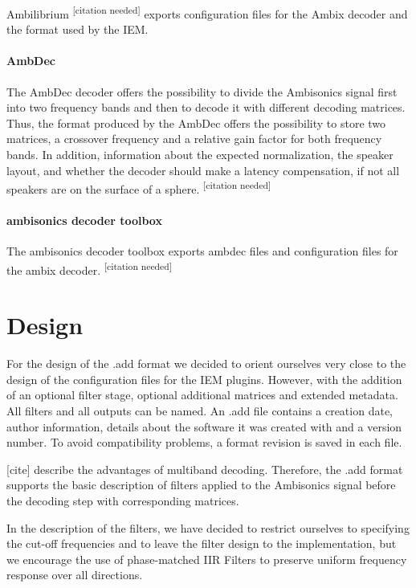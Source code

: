 \documentclass[a4paper, 10pt, twocolumn]{article}
\newcommand{\citationneeded}[1][]{\textsuperscript{\color{black} [citation needed]}}
\begin{document}
Ambilibrium \citationneeded{} exports configuration files for the Ambix decoder and the format used by the IEM.

\paragraph{AmbDec}

The AmbDec decoder offers the possibility to divide the Ambisonics signal first into two frequency bands and then to decode it with different decoding matrices. Thus, the format produced by the AmbDec offers the possibility to store two matrices, a crossover frequency and a relative gain factor for both frequency bands. In addition, information about the expected normalization, the speaker layout, and whether the decoder should make a latency compensation, if not all speakers are on the surface of a sphere.\citationneeded{}

\paragraph{ambisonics decoder toolbox}

The ambisonics decoder toolbox exports ambdec files and configuration files for the ambix decoder.\citationneeded{}


\section{Design} \label{sec:Design}

For the design of the .add format we decided to orient ourselves very close to the design of the configuration files for the IEM plugins. However, with the addition of an optional filter stage, optional additional matrices and extended metadata. All filters and all outputs can be named. An .add file contains a creation date, author information, details about the software it was created with and a version number. To avoid compatibility problems, a format revision is saved in each file. 

[cite] describe the advantages of multiband decoding. Therefore, the .add format supports the basic description of filters applied to the Ambisonics signal before the decoding step with corresponding matrices.

In the description of the filters, we have decided to restrict ourselves to specifying the cut-off frequencies and to leave the filter design to the implementation, but we encourage the use of phase-matched IIR Filters to preserve uniform frequency response over all directions.
\end{document}
